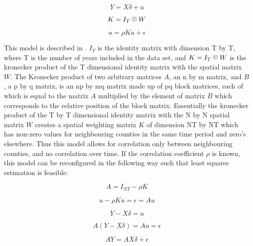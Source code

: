 \def\kronecker{\raisebox{1pt}{\ensuremath{\:\otimes\:}}} 

\begin{equation}
Y= X\delta+u
\end{equation}

\begin{equation}
K=I_{T}\kronecker{W}
\end{equation}

\begin{equation}
u=\rho Ku+\epsilon
\end{equation}

This model is described in \citep{ord1975estimation}. $I_{T}$ is the identity matrix with dimension T by T, where T is the number of years included in the data set, and $K=I_{T}\kronecker{W}$ is the kronecker product of the T dimensional identity matrix with the spatial matrix $W$. The Kronecker product of two arbitrary matrices $A$, an n by m matrix, and $B$, a p by q matrix, is an np by mq matrix made up of pq block matrices, each of which is equal to the matrix $A$ multiplied by the element of matrix $B$ which corresponds to the relative position of the block matrix. Essentially the kronecker product of the T by T dimensional identity matrix with the N by N spatial matrix $W$ creates a spatial weighting matrix $K$ of dimension NT by NT which has non-zero values for neighbouring counties in the same time period and zero's elsewhere. Thus this model allows for correlation only between neighbouring counties, and no correlation over time. If the correlation coefficient $\rho$ is known, this model can be reconfigured in the following way such that least squares estimation is feasible:

\begin{equation}
A=I_{NT}-\rho K
\end{equation}

\begin{equation}
u-\rho Ku=\epsilon=Au
\end{equation}

\begin{equation}
Y- X\delta=u
\end{equation}

\begin{equation}
    A(Y- X\delta)=Au=\epsilon
\end{equation}

\begin{equation}
    AY=AX\delta +\epsilon
\end{equation}

